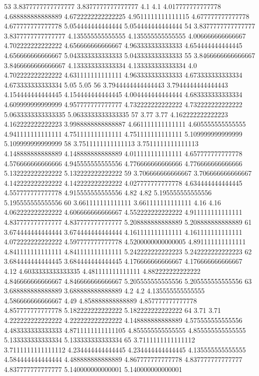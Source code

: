 53 3.8377777777777777 3.8377777777777777 4.1 4.1 4.017777777777778 4.688888888888889 4.6722222222222225 4.9511111111111115 4.677777777777778 4.677777777777778 5.054444444444444 5.054444444444444
54 3.8377777777777777 3.8377777777777777 4.135555555555555 4.135555555555555 4.006666666666667 4.702222222222222 4.656666666666667 4.963333333333333 4.654444444444445 4.656666666666667 5.043333333333333 5.043333333333333
55 3.8466666666666667 3.8466666666666667 4.133333333333334 4.133333333333334 4.0 4.702222222222222 4.631111111111111 4.963333333333333 4.673333333333334 4.673333333333334 5.05 5.05
56 3.7944444444444443 3.7944444444444443 4.154444444444445 4.154444444444445 4.004444444444444 4.683333333333334 4.609999999999999 4.957777777777777 4.732222222222222 4.732222222222222 5.0633333333333335 5.0633333333333335
57 3.77 3.77 4.162222222222223 4.162222222222223 3.9988888888888887 4.661111111111111 4.605555555555555 4.941111111111111 4.751111111111111 4.751111111111111 5.109999999999999 5.109999999999999
58 3.7511111111111113 3.7511111111111113 4.148888888888889 4.148888888888889 4.011111111111111 4.657777777777778 4.576666666666666 4.945555555555556 4.776666666666666 4.776666666666666 5.132222222222222 5.132222222222222
59 3.706666666666667 3.706666666666667 4.142222222222222 4.142222222222222 4.027777777777778 4.634444444444445 4.557777777777778 4.915555555555556 4.82 4.82 5.195555555555556 5.195555555555556
60 3.661111111111111 3.661111111111111 4.16 4.16 4.062222222222222 4.606666666666667 4.552222222222222 4.911111111111111 4.837777777777777 4.837777777777777 5.208888888888889 5.208888888888889
61 3.674444444444444 3.674444444444444 4.161111111111111 4.161111111111111 4.072222222222222 4.597777777777778 4.5200000000000005 4.891111111111111 4.841111111111111 4.841111111111111 5.242222222222223 5.242222222222223
62 3.684444444444445 3.684444444444445 4.176666666666667 4.176666666666667 4.12 4.6033333333333335 4.481111111111111 4.882222222222222 4.846666666666667 4.846666666666667 5.205555555555556 5.205555555555556
63 3.688888888888889 3.688888888888889 4.2 4.2 4.135555555555555 4.586666666666667 4.49 4.858888888888889 4.857777777777778 4.857777777777778 5.182222222222222 5.182222222222222
64 3.71 3.71 4.222222222222222 4.222222222222222 4.148888888888889 4.575555555555556 4.483333333333333 4.8711111111111105 4.855555555555555 4.855555555555555 5.133333333333334 5.133333333333334
65 3.7111111111111112 3.7111111111111112 4.234444444444445 4.234444444444445 4.135555555555555 4.584444444444444 4.488888888888889 4.867777777777778 4.837777777777777 4.837777777777777 5.140000000000001 5.140000000000001
